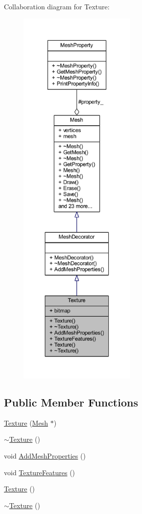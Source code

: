 Collaboration diagram for Texture\+:
\nopagebreak
\begin{figure}[H]
\begin{center}
\leavevmode
\includegraphics[height=550pt]{class_texture__coll__graph}
\end{center}
\end{figure}
\subsection*{Public Member Functions}
\begin{DoxyCompactItemize}
\item 
\mbox{\hyperlink{class_texture_a6d13acc5d63187bb129f28d29f9a794f}{Texture}} (\mbox{\hyperlink{class_mesh}{Mesh}} $\ast$)
\item 
\mbox{\hyperlink{class_texture_a09c4bcb7462f64c1d20fa69dba3cee8a}{$\sim$\+Texture}} ()
\item 
void \mbox{\hyperlink{class_texture_aa7e2f179b2117c32e03e38fdc0f85290}{Add\+Mesh\+Properties}} ()
\item 
void \mbox{\hyperlink{class_texture_a8bd22c7780366ad3101d0f40df374866}{Texture\+Features}} ()
\item 
\mbox{\hyperlink{class_texture_a6c275e3f186675ff6ed73ccf970e552f}{Texture}} ()
\item 
\mbox{\hyperlink{class_texture_a09c4bcb7462f64c1d20fa69dba3cee8a}{$\sim$\+Texture}} ()
\end{DoxyCompactItemize}
